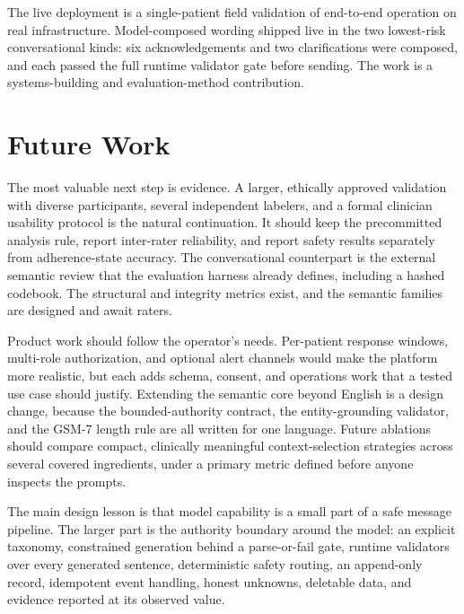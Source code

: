 The live deployment is a single-patient field validation of end-to-end
operation on real infrastructure. Model-composed wording shipped live in the two
lowest-risk conversational kinds: six acknowledgements and two clarifications
were composed, and each passed the full runtime validator gate before sending.
The work is a systems-building and evaluation-method contribution.

\section{Future Work}

The most valuable next step is evidence. A larger, ethically approved
validation with diverse participants, several independent labelers, and a
formal clinician usability protocol is the natural continuation. It should keep the precommitted analysis rule, report
inter-rater reliability, and report safety results separately from
adherence-state accuracy. The conversational counterpart is the external
semantic review that the evaluation harness already defines, including a hashed
codebook. The structural and integrity metrics exist, and the semantic families
are designed and await raters.

Product work should follow the operator's needs. Per-patient response windows,
multi-role authorization, and optional alert channels would make the platform
more realistic, but each adds schema, consent, and operations work that a
tested use case should justify. Extending the semantic core beyond English is a
design change, because the bounded-authority contract, the entity-grounding
validator, and the GSM-7 length rule are all written for one language. Future
ablations should compare compact, clinically meaningful context-selection
strategies across several covered ingredients, under a primary metric defined
before anyone inspects the prompts.

The main design lesson is that model capability is a small part of a safe
message pipeline. The larger part is the authority boundary around the model:
an explicit taxonomy, constrained generation behind a parse-or-fail gate,
runtime validators over every generated sentence, deterministic safety routing,
an append-only record, idempotent event handling, honest unknowns, deletable
data, and evidence reported at its observed value.
